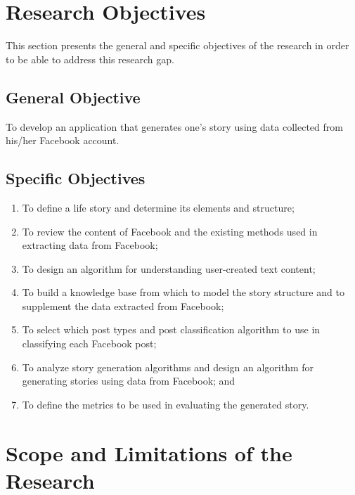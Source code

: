 \section{Research Objectives}
\label{sec:researchobjectives}

This section presents the general and specific objectives of the research in order to be able to address this research gap.

\subsection{General Objective}
\label{sec:generalobjective}

To develop an application that generates one's story using data collected from his/her Facebook account.

\subsection{Specific Objectives}
\label{sec:specificobjectives}

\begin{enumerate}
   \item To define a life story and determine its elements and structure;
   \item To review the content of Facebook and the existing methods used in extracting data from Facebook;
   \item To design an algorithm for understanding user-created text content;
   \item To build a knowledge base from which to model the story structure and to supplement the data extracted from Facebook;
   \item To select which post types and post classification algorithm to use in classifying each Facebook post;
   \item To analyze story generation algorithms and design an algorithm for generating stories using data from Facebook; and
   \item To define the metrics to be used in evaluating the generated story.
\end{enumerate}

\section{Scope and Limitations of the Research}
\label{sec:scopelimitations}

